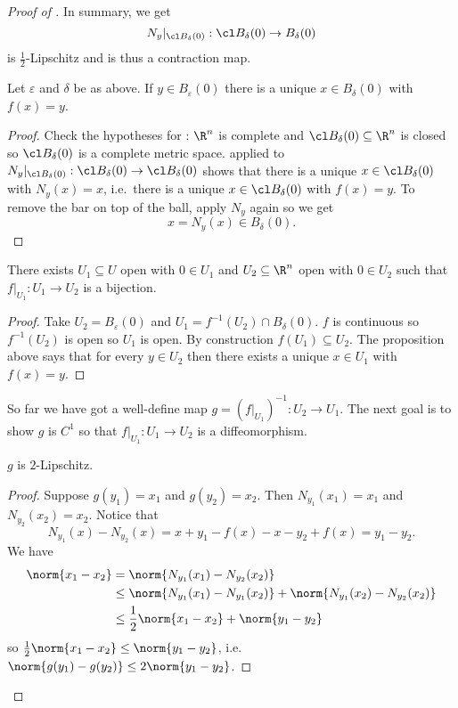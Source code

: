 \documentclass[a4paper]{article}
\theoremstyle{definition}
\begin{document}
\begin{proof}[Proof of ]
  In summary, we get
  \[
    N_y|_{\cl B_\delta(0)}: \cl B_\delta(0) \to B_\delta(0)
  \]
  is \(\frac{1}{2}\)-Lipschitz and is thus a contraction map.

  \begin{proposition}
    Let \(\varepsilon\) and \(\delta\) be as above. If \(y \in B_\varepsilon(0)\) there is a unique \(x \in B_\delta(0)\) with \(f(x) = y\).
  \end{proposition}

  \begin{proof}
    Check the hypotheses for : \(\R^n\) is complete and \(\cl B_\delta(0) \subseteq \R^n\) is closed so \(\cl B_\delta(0)\) is a complete metric space.  applied to \(N_y|_{\cl B_\delta(0)}: \cl B_\delta(0) \to \cl B_\delta(0)\) shows that there is a unique \(x \in \cl B_\delta(0)\) with \(N_y(x) = x\), i.e.\ there is a unique \(x \in \cl B_\delta(0)\) with \(f(x) = y\). To remove the bar on top of the ball, apply \(N_y\) again so we get
    \[
      x = N_y(x) \in B_\delta(0).
    \]
  \end{proof}

  \begin{corollary}
    There exists \(U_1 \subseteq U\) open with \(0 \in U_1\) and \(U_2 \subseteq \R^n\) open with \(0 \in U_2\) such that \(f|_{U_1}: U_1 \to U_2\) is a bijection.
  \end{corollary}

  \begin{proof}
    Take \(U_2 = B_\varepsilon(0)\) and \(U_1 = f^{-1}(U_2) \cap B_\delta(0)\). \(f\) is continuous so \(f^{-1}(U_2)\) is open so \(U_1\) is open. By construction \(f(U_1) \subseteq U_2\). The proposition above says that for every \(y \in U_2\) then there exists a unique \(x \in U_1\) with \(f(x) = y\).
  \end{proof}

  So far we have got a well-define map \(g = (f|_{U_1})^{-1}: U_2 \to U_1\). The next goal is to show \(g\) is \(C^1\) so that \(f|_{U_1}: U_1 \to U_2\) is a diffeomorphism.

  \begin{lemma}
    \(g\) is \(2\)-Lipschitz.
  \end{lemma}

  \begin{proof}
    Suppose \(g(y_1) = x_1\) and \(g(y_2) = x_2\). Then \(N_{y_1}(x_1) = x_1\) and \(N_{y_2}(x_2) = x_2\). Notice that
    \[
      N_{y_1}(x) - N_{y_2}(x) = x + y_1 - f(x) - x - y_2 + f(x) = y_1 - y_2.
    \]
    We have
    \begin{align*}
      \norm{x_1 - x_2} &= \norm{N_{y_1}(x_1) - N_{y_2}(x_2)} \\
                       &\leq \norm{N_{y_1}(x_1) - N_{y_1}(x_2)} + \norm{N_{y_1}(x_2) - N_{y_2}(x_2)} \\
                       &\leq \frac{1}{2}\norm{x_1 - x_2} + \norm{y_1 - y_2}
    \end{align*}
    so \(\frac{1}{2}\norm{x_1 - x_2} \leq \norm{y_1 - y_2}\), i.e.\ \(\norm{g(y_1) - g(y_2)} \leq 2\norm{y_1 - y_2}\).
  \end{proof}


\end{proof}
\end{document}
